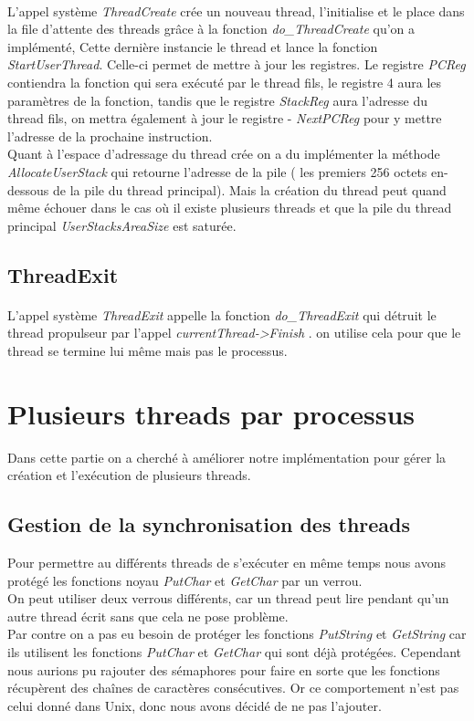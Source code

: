 \documentclass[12pt, a4paper]{report}
\begin{document}
	\paragraph{}
 L'appel système \textit{ ThreadCreate } crée un nouveau thread, l'initialise et le place dans la file d'attente des threads grâce à la fonction  \textit{ do\_ThreadCreate } qu'on a implémenté, Cette dernière instancie le thread et lance la fonction  \textit{ StartUserThread}. Celle-ci permet de mettre à jour les registres. Le registre \textit{ PCReg } contiendra la fonction qui sera exécuté par le thread fils, le registre 4  aura les paramètres de la fonction, tandis que le registre \textit{StackReg } aura l'adresse du thread fils, on mettra également à jour le registre -\textit{ NextPCReg } pour y mettre l'adresse de la prochaine instruction.\\
Quant à l'espace d'adressage du thread crée on a du implémenter la méthode  \textit{ AllocateUserStack} qui retourne l'adresse de la pile ( les premiers 256 octets en-dessous de la pile du thread principal). Mais la création du thread peut quand même échouer dans le cas où il existe plusieurs threads et que la pile du thread principal \textit{ UserStacksAreaSize } est saturée.
\subsection{ThreadExit }
	\paragraph{}
 L'appel système \textit{ ThreadExit } appelle la fonction \textit{ do\_ThreadExit } qui détruit le thread propulseur par l'appel \textit{ currentThread->Finish }. on utilise cela pour que le thread se termine lui même mais pas le processus.

\section{Plusieurs threads par processus}

Dans cette partie on a cherché à améliorer notre implémentation pour gérer la création et l'exécution de plusieurs threads. \\   
\subsection{Gestion de la synchronisation des threads }
Pour permettre au différents threads de s'exécuter en même temps nous avons protégé les fonctions noyau \textit{ PutChar }  et \textit{ GetChar } par un verrou.  \\
On peut utiliser deux verrous différents, car un thread peut lire pendant qu'un autre thread écrit sans que cela ne pose problème.   \\
Par contre on a pas eu besoin de protéger les fonctions \textit{ PutString } et \textit{ GetString } car ils utilisent les fonctions  \textit{ PutChar }  et \textit{ GetChar } qui sont déjà protégées. Cependant nous aurions pu rajouter des sémaphores pour faire en sorte que les fonctions récupèrent des chaînes de caractères consécutives. Or ce comportement  n'est pas celui donné dans Unix, donc nous avons décidé de ne pas l'ajouter. 
\end{document}
